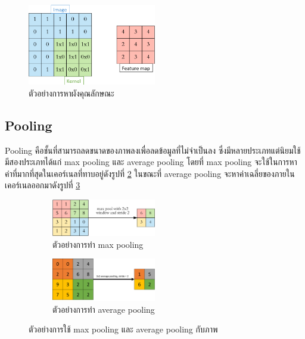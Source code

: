 \begin{figure}[!ht]
	\centering
	\includegraphics[width=0.5\textwidth]{chapter2/images/feature_map.png}
		\caption{ตัวอย่างการหาผังคุณลักษณะ }
    	\label{fig:example feature map}
\end{figure}

\subsection*{Pooling}
Pooling คือชั้นที่สามารถลดขนาดของภาพลงเพื่อลดข้อมูลที่ไม่จำเป็นลง ซึ่งมีหลายประเภทแต่นิยมใช้มีสองประเภทได้แก่ max pooling และ average pooling
โดยที่ max pooling จะใช้ในการหาค่าที่มากที่สุดในเคอร์เนลที่ทาบอยู่ดังรูปที่ \ref{fig:example max pooling} ในขณะที่ average pooling 
จะหาค่าเฉลี่ยของภายในเคอร์เนลออกมาดังรูปที่ \ref{fig:example average pooling}
\begin{figure}[!ht]
	\centering
	\begin{subfigure}[b]{1.0\textwidth}
		\centering
		\includegraphics[width=0.5\textwidth]{chapter2/images/max_pooling.png}
		\caption{ตัวอย่างการทำ max pooling}
		\label{fig:example max pooling}
    \end{subfigure}
    \begin{subfigure}[b]{1.0\textwidth}
        \centering
		\includegraphics[width=0.5\textwidth]{chapter2/images/average_pooling.png}
		\caption{ตัวอย่างการทำ average pooling}
		\label{fig:example average pooling}
	\end{subfigure}
	\caption{ตัวอย่างการใช้ max pooling และ average pooling กับภาพ}
	\label{fig:pooling_ex}
\end{figure}
\clearpage

